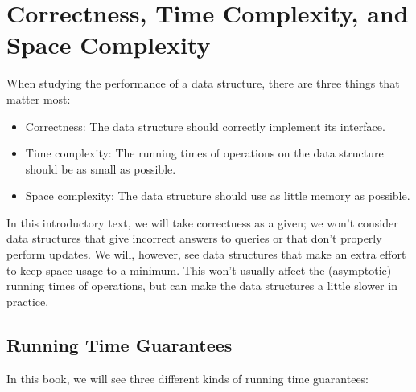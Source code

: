 \section{Correctness, Time Complexity, and Space Complexity}

When studying the performance of a data structure, there are three things
that matter most:

\begin{itemize}
  \item Correctness: The data structure should correctly implement its interface.
  \item Time complexity: The running times of operations on the data
    structure should be as small as possible.
  \item Space complexity: The data structure should use as little memory
    as possible.
\end{itemize}


In this introductory text, we will take correctness as a given;  we
won't consider data structures that give incorrect answers to queries
or that don't properly perform updates.  We will, however, see data
structures that make an extra effort to keep space usage to a minimum.
This won't usually affect the (asymptotic) running times of operations,
but can make the data structures a little slower in practice.

\subsection{Running Time Guarantees}

In this book, we will see three different kinds of running time guarantees:

